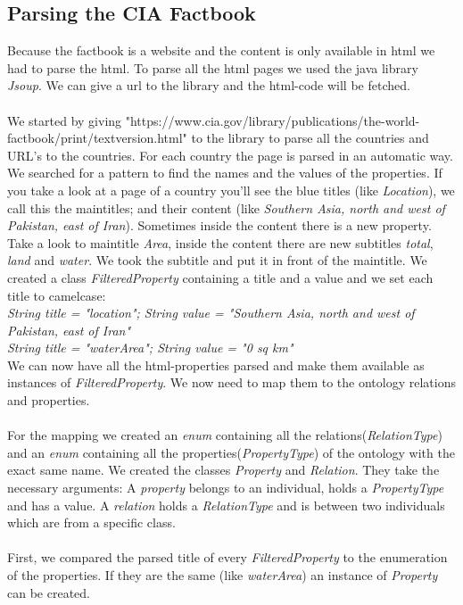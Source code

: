 \documentclass{article}
\begin{document}
\subsection{Parsing the CIA Factbook}
\label{sec:factbook}
Because the factbook is a website and the content is only available in html we had to parse the html.
To parse all the html pages we used the java library \textit{Jsoup}. We can give a url to the library and the html-code will be fetched.
\\
\\We started by giving "https://www.cia.gov/library/publications/the-world-factbook/print/textversion.html" to the library to parse all the countries and URL's to the countries.
For each country the page is parsed in an automatic way. We searched for a pattern to find the names and the values of the properties.
If you take a look at a page of a country you'll see the blue titles (like \textit{Location}), we call this the maintitles; and their content (like \textit{Southern Asia, north and west of Pakistan, east of Iran}).
Sometimes inside the content there is a new property. Take a look to maintitle \textit{Area}, inside the content there are new subtitles \textit{total}, \textit{land} and \textit{water}. We took the subtitle and put it in front of the maintitle.
We created a class \textit{FilteredProperty} containing a title and a value and we set each title to camelcase:
\\\textit{String title = "location"; String value = "Southern Asia, north and west of Pakistan, east of Iran"}
\\\textit{String title = "waterArea"; String value = "0 sq km"}
\\We can now have all the html-properties parsed and make them available as instances of \textit{FilteredProperty}. We now need to map them to the ontology relations and properties.
\\
\\For the mapping we created an \textit{enum} containing all the relations(\textit{RelationType}) and an \textit{enum} containing all the properties(\textit{PropertyType}) of the ontology with the exact same name. We created the classes \textit{Property} and \textit{Relation}.
They take the necessary arguments: A \textit{property} belongs to an individual, holds a \textit{PropertyType} and has a value.
A \textit{relation} holds a \textit{RelationType} and is between two individuals which are from a specific class.
\\
\\First, we compared the parsed title of every \textit{FilteredProperty} to the enumeration of the properties. If they are the same (like \textit{waterArea}) an instance of \textit{Property} can be created.
\end{document}
